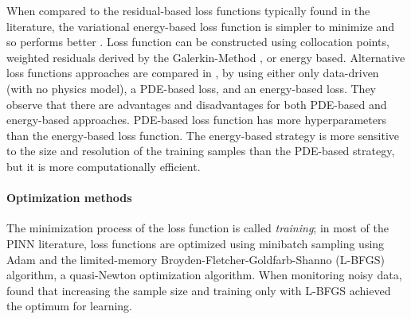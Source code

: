 \documentclass[pdflatex,sn-basic]{sn-jnl}%
\theoremstyle{thmstyleone}%
\theoremstyle{thmstyletwo}%
\theoremstyle{thmstylethree}%
\newcommand{\norm}[1]{\left\lVert#1\right\rVert}
\begin{document}



When compared to the residual-based loss functions typically found in the literature, the variational energy-based loss function is simpler to minimize and so performs better
\citep{Gos2020_TransferLearningEnhanced_AniGACR}.
%
Loss function can be constructed using
collocation points,
weighted residuals derived by the Galerkin-Method \citep{Kha2019_VariationalPhysicsInformed_ZhaKZK},
or energy based.
%
Alternative loss functions approaches are compared in \cite{Li2021_PhysicsGuidedNeural_BazLBZ}, by using either only data-driven (with no physics model), a PDE-based loss, and an energy-based loss. 
They observe that there are advantages and disadvantages for both PDE-based and  energy-based approaches. PDE-based loss function has more hyperparameters than the energy-based loss function. The energy-based strategy is more sensitive to the size and resolution of the training samples than the PDE-based strategy, but it is more computationally efficient. 


\paragraph{Optimization methods}

The minimization process of the loss function is called \emph{training};
%
in most of the PINN literature, loss functions are optimized using minibatch sampling using 
Adam and the limited-memory Broyden-Fletcher-Goldfarb-Shanno (L-BFGS) algorithm, a quasi-Newton optimization algorithm. When monitoring noisy data, \cite{Mat2021_UncoveringTurbulentPlasma_FraMFH} found that increasing the sample size and training only with L-BFGS achieved the optimum for learning.
\end{document}
